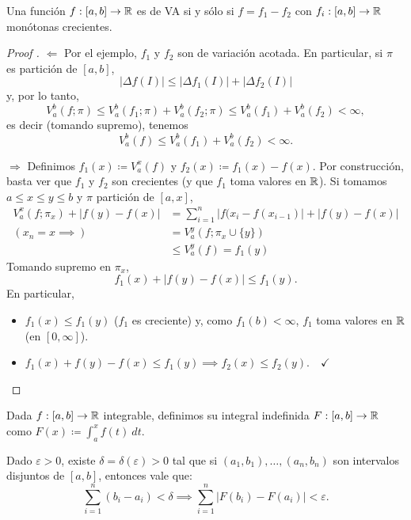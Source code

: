 \begin{theorem}
	Una función $f : [a,b] \to \mathbb{R}$ es de VA si y sólo si $f = f_{1} - f_{2}$ con $f_{i} : [a,b] \to \mathbb{R}$ monótonas crecientes.
\end{theorem}
\begin{proof}[Proof ]
	$\boxed{\Leftarrow}$ Por el ejemplo, $f_{1}$ y $f_{2}$ son de variación acotada. En particular, si $\pi$ es partición de $[a,b]$,
	\[ |\Delta f(I)| \leq |\Delta f_{1}(I)| + |\Delta f_{2}(I)| \]
	y, por lo tanto,
	\[ V_{a}^{b}(f;\pi) \leq V_{a}^{b}(f_{1};\pi) + V_{a}^{b}(f_{2};\pi) \leq V_{a}^{b}(f_{1}) + V_{a}^{b}(f_{2}) < \infty, \]
	es decir (tomando supremo), tenemos
	\[ V_{a}^{b}(f) \leq V_{a}^{b}(f_{1}) + V_{a}^{b}(f_{2}) < \infty. \]
	\par
	$\boxed{\Rightarrow}$ Definimos $f_{1}(x) \coloneq V_{a}^{x}(f)$ y $f_{2}(x) \coloneq f_{1}(x) - f(x)$. Por construcción, basta ver que $f_{1}$ y $f_{2}$ son crecientes (y que $f_{1}$ toma valores en $\mathbb{R}$). Si tomamos $a \leq x \leq y \leq b$ y $\pi$ partición de $[a,x]$,
	\begin{align*}
		V_{a}^{x}(f;\pi_{x}) + |f(y) - f(x)| &= \sum_{i=1}^{n} |f(x_{i} - f(x_{i-1})| + |f(y) - f(x)| \\
		(x_{n} = x \implies) \ &= V_{a}^{y}(f; \pi_{x} \cup \{y\}) \\
		&\leq V_{a}^{y}(f) = f_{1}(y)
	\end{align*}
	Tomando supremo en $\pi_{x}$,
	\[ f_{1}(x) + |f(y) - f(x)| \leq f_{1}(y). \]
	En particular,
	\begin{itemize}
		\item $f_{1}(x) \leq f_{1}(y)$ ($f_{1}$ es creciente) y, como $f_{1}(b) < \infty$, $f_{1}$ toma valores en $\mathbb{R}$ (en $[0,\infty]$).

		\item $f_{1}(x) + f(y) - f(x) \leq f_{1}(y) \implies f_{2}(x) \leq f_{2}(y). \quad \checkmark$
	\end{itemize}
\end{proof}

\begin{definition}
	Dada $f : [a,b] \to \mathbb{R}$ integrable, definimos su integral indefinida $F : [a,b] \to \mathbb{R}$ como $F(x) \coloneq \int_{a}^{x} f(t) \ dt$.
\end{definition}

\begin{theorem}
	Dado $\varepsilon > 0$, existe $\delta = \delta(\varepsilon) > 0$ tal que si $(a_{1},b_{1}),\dots,(a_{n},b_{n})$ son intervalos disjuntos de $[a,b]$, entonces vale que:
	\[ \sum_{i=1}^{n} (b_{i} - a_{i}) < \delta \implies \sum_{i=1}^{n} |F(b_{i}) - F(a_{i})| < \varepsilon. \]
\end{theorem}

